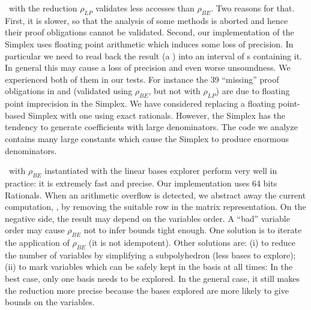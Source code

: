 \documentclass{llncs}
\begin{document}
\Subpoly\ with the reduction  $\rho_\mathit{LP}$ validates less accesses than $\rho_\mathit{BE}$.
Two reasons for that.
First, it is slower, so that the analysis of some methods is aborted and hence their proof obligations cannot be validated.
Second, our implementation of the Simplex uses floating point arithmetic which induces some loss of precision. 
In particular we need to read back the result (a ) into an interval of s containing it.
In general this may cause a loss of precision and even worse unsoundness.
We experienced both of them in our tests.
For instance the 39 ``missing''   proof obligations in  and  (validated using $\rho_\mathit{BE}$, but not  with $\rho_\mathit{LP}$) 
are  due to floating point imprecision in the Simplex.
We have considered replacing a floating point-based Simplex with one using exact rationals.
However,  the Simplex has the tendency to generate coefficients with large denominators.
The code we analyze contains many large constants which cause the Simplex to produce enormous denominators.

\Subpoly\ with $\rho_\mathit{BE}$ instantiated with the linear bases explorer perform very well in practice: it is extremely fast and precise.
Our implementation uses 64 bits Rationals.
When an arithmetic overflow is detected, we abstract away the current
computation, \eg, by removing the suitable row in the matrix representation.
On the negative side, the result may depend on the variables order.
A ``bad'' variable order may cause  $\rho_\mathit{BE}$ not to infer bounds tight enough.
One solution is to iterate the application of $\rho_\mathit{BE}$ (it is not idempotent).
Other solutions are: (i) to reduce the number of variables by
simplifying a subpolyhedron (less bases to explore);
(ii) to mark variables which can be safely kept in the basis at all times: In the best case, only one basis needs to be explored. 
In the general case, it still makes the reduction more precise because the bases explored are more likely to give bounds on the variables.
\end{document}
